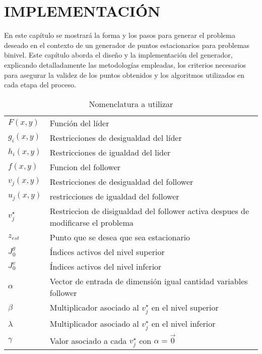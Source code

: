 \chapter{IMPLEMENTACIÓN}

En este capítulo se mostrará la forma y los pasos para generar el problema deseado en el contexto de un generador de puntos estacionarios para problemas binivel. Este capítulo aborda el diseño y la implementación del generador, explicando detalladamente las metodologías empleadas, los criterios necesarios para asegurar la validez de los puntos obtenidos y los algoritmos utilizados en cada etapa del proceso.

\begin{table}[H]
    \centering
    \caption{Nomenclatura a utilizar}
    \begin{tabular}{l m{360pt}}
        $ F(x,y) $              & Función del líder                                                                                                          \\
        $ g_i(x,y) $              & Restricciones de desigualdad del líder                                                                                                            \\
        $ h_i(x,y) $                 & Restricciones de igualdad del lider                       \\
        $ f(x,y) $           & Funcion del follower                                                               \\
        $ v_j(x,y) $              &  Restricciones de desigualdad del follower  \\
        $ u_j(x,y) $     & restricciones de igualdad del follower\\
        $ v_{j}^{\star} $    & Restriccion de disigualdad del follower activa despues de modificarse el problema            \\
        $z_{est}$         & Punto que se desea que sea estacionario\\
        $J_0^g$   & Índices activos del nivel superior \\
        $J_0^v$   & Índices activos del nivel inferior \\
        $ \alpha  $             & Vector de entrada de dimensión igual cantidad variables follower                                                                                                      \\
        $ \beta $               & Multiplicador asociado al $v_{j}^{\star}$ en el nivel superior          \\
        $ \lambda $              & Multiplicador asociado al $v_{j}^{\star}$ en el nivel inferior\\
        $\gamma$                & Valor asociado a cada $v_{j}^{\star}$ con $\alpha=\vec{0}$\\
    \end{tabular}

    \end{table}


